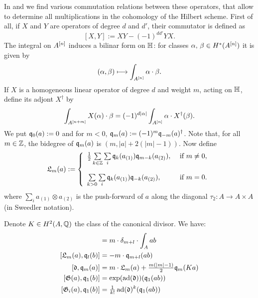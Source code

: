 In \cite{LehnSorger} and \cite{LiQinWang} we find various commutation relations between these operators, that allow to determine all multiplications in the cohomology of the Hilbert scheme. First of all, if $X$ and $Y$ are operators of degree $d$ and $d'$, their commutator is defined as 
$$
[X,Y] := XY - (-1)^{dd'}YX.
$$
The integral on $A^{[n]}$ induces a bilinar form on $\mathbb{H}$: for classes $\alpha,\,\beta\in H^*(A^{[n]})$ it is given by
$$
(\alpha,\beta) \longmapsto \int_{A^{[n]}}\alpha\cdot\beta.
$$
If $X$ is a homogeneous linear operator of degree $d$ and weight $m$, acting on $\mathbb{H}$, define its adjont $X^\dagger$ by
$$
\int_{A^{[n+m]}}X(\alpha)\cdot\beta = (-1)^{d|\alpha|}\int_{A^{[n]}} \alpha \cdot X^\dagger (\beta).
$$
We put $\mathfrak{q}_0(a) :=0$ and for $m<0$, $\mathfrak{q}_m(a) := (-1)^m \mathfrak{q}_{-m}(a)^\dagger$. Note that, for all $m\in\mathbb{Z}$, the bidegree of $\mathfrak{q}_m(a)$ is $(m,|a| + 2(|m|-1))$. Now define
$$
\mathfrak{L}_m(a) := \left\{ 
\begin{array}{ll}
 \tfrac{1}{2}\sum\limits_{k\in\Z}\sum\limits_{i}\q_k( a_{(1)})\q_{m-k}( a_{(2)}), & \text{ if } m\neq 0, \vspace{4mm}\\
 \sum\limits_{k>0}\sum\limits_{i}\q_k( a_{(1)})\q_{-k}( a_{(2)}), & \text{ if } m= 0. \\
\end{array}
\right.
$$
where $\sum_i a_{(1)}\otimes  a_{(2)}$ is the push-forward of $a$ along the diagonal $\tau_2 :A \rightarrow A\times A$ (in Sweedler notation).
\begin{lemma}\cite[Thm.~2.16]{LiQinWang} Denote $K\in H^2(A,\mathbb{Q})$ the class of the canonical divisor. We have:
\begin{align}
[\q_m(a), \q_l(b)] &= m\cdot \delta_{m+l} \cdot \int_A ab \\
[\mathfrak{L}_m(a),\q_l(b)] &= -m\cdot \q_{m+l}(ab) \\
\label{DiffNaka}
[\mathfrak{d},\q_m(a)] &= m \cdot \mathfrak{L}_m(a) + \tfrac{m(|m|-1)}{2} \q_m(K a) \\
[\G(a),\q_1(b)] &= \exp(\ad(\mathfrak{d}))(\q_1(a b) ) \\
[\G_i(a),\q_1(b)] &= \tfrac{1}{k!} \ad(\mathfrak{d})^k(\q_1(a b) ) 
\end{align}
\end{lemma}
